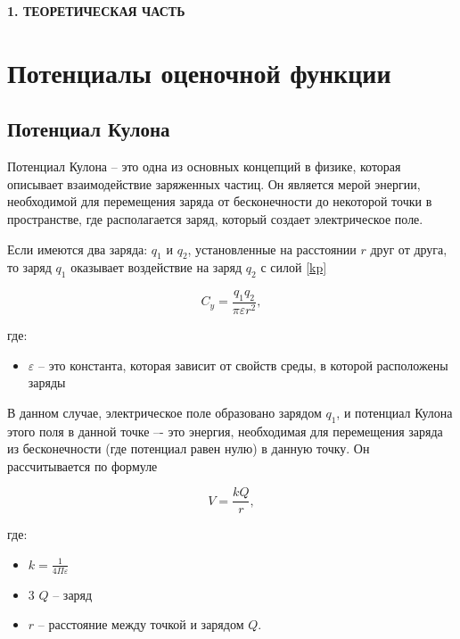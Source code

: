 \newpage
\begin{center}
  \textbf{\large 1. ТЕОРЕТИЧЕСКАЯ ЧАСТЬ}
\end{center}


\section{Потенциалы оценочной функции}

\subsection{Потенциал Кулона}


Потенциал Кулона -- это одна из основных концепций в физике, которая описывает взаимодействие заряженных частиц. Он является мерой энергии, необходимой для перемещения заряда от бесконечности до некоторой точки в пространстве, где располагается заряд, который создает электрическое поле.

Если имеются два заряда:  $q_1$ и $q_2$, установленные на расстоянии $r$ друг от друга, то заряд $q_1$ оказывает воздействие на заряд $q_2$ с силой \ref{kp} 

\begin{equation}
	C_y = \frac{q_1 q_2}{\pi \varepsilon r^2},
	\label{kp}
\end{equation}

где:
\begin{itemize}
	\item $\varepsilon$ -- это константа, которая зависит от свойств среды, в которой расположены заряды
\end{itemize}

В данном случае, электрическое поле образовано зарядом $q_1$, и потенциал Кулона этого поля в данной точке –- это энергия, необходимая для перемещения заряда из бесконечности (где потенциал равен нулю) в данную точку. Он рассчитывается по формуле

\begin{equation}
	V = \frac{k Q}{r},
	\label{ef}
\end{equation}

где:
\begin{itemize}
	\item $k = \frac{1}{4 \Pi \varepsilon}$
	\item3 $Q$ -- заряд
	\item $r$ -- расстояние между точкой и зарядом $Q$.
\end{itemize}

